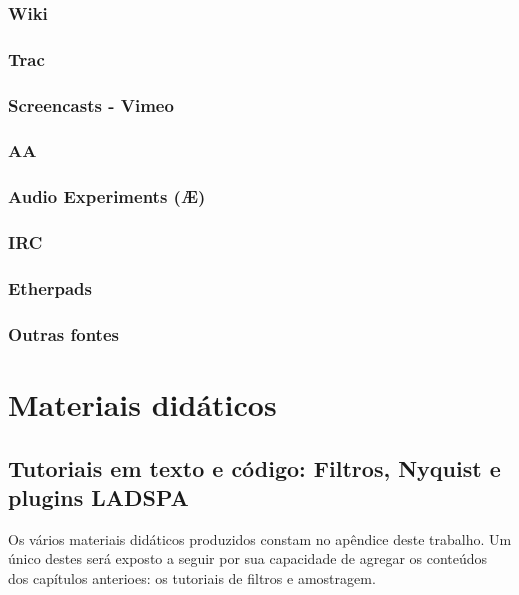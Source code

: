 \subsubsection{Wiki}

\subsubsection{Trac}

\subsubsection{Screencasts - Vimeo}

\subsubsection{AA}

\subsubsection{Audio Experiments (Æ)}

\subsubsection{IRC}

\subsubsection{Etherpads}

\subsubsection{Outras fontes}


\section{Materiais didáticos}

  \subsection{Tutoriais em texto e código: Filtros, Nyquist e plugins LADSPA}

Os vários materiais didáticos produzidos constam no apêndice
deste trabalho. Um único destes será exposto a seguir por sua
capacidade de agregar os conteúdos dos capítulos anterioes:
os tutoriais de filtros e amostragem.

